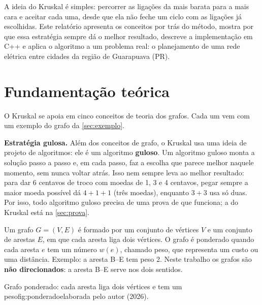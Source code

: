 \documentclass[a4paper]{article}
\begin{document}
A ideia do Kruskal é simples: percorrer as ligações da mais barata para a mais
cara e aceitar cada uma, desde que ela não feche um ciclo com as ligações já
escolhidas. Este relatório apresenta os conceitos por trás do método, mostra por
que essa estratégia sempre dá o melhor resultado, descreve a implementação em C++
e aplica o algoritmo a um problema real: o planejamento de uma rede elétrica
entre cidades da região de Guarapuava (PR).

\section{Fundamentação teórica}\label{sec:fundamentacao}
O Kruskal se apoia em cinco conceitos de teoria dos grafos. Cada um vem com um
exemplo do grafo da \cref{sec:exemplo}.

\textbf{Estratégia gulosa.} Além dos conceitos de grafo, o Kruskal usa uma ideia
de projeto de algoritmos: ele é um algoritmo \textbf{guloso}. Um algoritmo
guloso monta a solução passo a passo e, em cada passo, faz a escolha que parece
melhor naquele momento, sem nunca voltar atrás. Isso nem sempre leva ao melhor
resultado: para dar 6 centavos de troco com moedas de 1, 3 e 4 centavos, pegar
sempre a maior moeda possível dá $4 + 1 + 1$ (três moedas), enquanto $3 + 3$ usa
só duas. Por isso, todo algoritmo guloso precisa de uma prova de que funciona; a
do Kruskal está na \cref{sec:prova}.

\begin{definicao}
Um grafo $G = (V, E)$ é formado por um conjunto de vértices $V$ e um conjunto de
arestas $E$, em que cada aresta liga dois vértices. O grafo é ponderado quando
cada aresta $e$ tem um número $w(e)$, chamado peso, que representa um custo ou
uma distância. Exemplo: a aresta B--E tem peso 2. Neste trabalho os grafos são
\textbf{não direcionados}: a aresta B--E serve nos dois sentidos.
\end{definicao}

\begin{figura}{Grafo ponderado: cada aresta liga dois vértices e tem um peso}{fig:ponderado}{elaborada pelo autor (2026).}
\end{figura}
\end{document}
